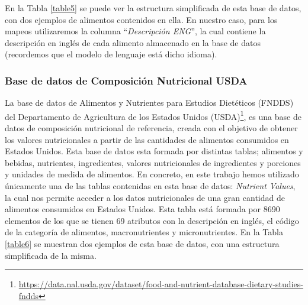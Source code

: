 En la Tabla \ref{table5} se puede ver la estructura simplificada de esta base de datos, con dos ejemplos de alimentos contenidos en ella. En nuestro caso, para los mapeos utilizaremos la columna ``\textit{Descripción ENG}'', la cual contiene la descripción en inglés de cada alimento almacenado en la base de datos (recordemos que el modelo de lenguaje está dicho idioma).


\subsubsection{Base de datos de Composición Nutricional USDA}

La base de datos de Alimentos y Nutrientes para Estudios Dietéticos (FNDDS) del Departamento de Agricultura de los Estados Unidos (USDA)\footnote{\url{https://data.nal.usda.gov/dataset/food-and-nutrient-database-dietary-studies-fndds}}, es una base de datos de composición nutricional de referencia, creada con el objetivo de obtener los valores nutricionales a partir de las cantidades de alimentos consumidos en Estados Unidos. Esta base  de datos esta formada por distintas tablas; alimentos y bebidas, nutrientes, ingredientes, valores nutricionales de ingredientes y porciones y unidades de medida de alimentos. En concreto, en este trabajo hemos utilizado únicamente una de las tablas contenidas en esta base de datos: \textit{Nutrient Values}, la cual nos permite acceder a los datos nutricionales de una gran cantidad de alimentos consumidos en Estados Unidos. Esta tabla está formada por 8690 elementos de los que se tienen 69 atributos con la descripción en inglés, el código de la categoría de alimentos, macronutrientes y micronutrientes. En la Tabla \ref{table6} se muestran dos ejemplos de esta base de datos, con una estructura simplificada de la misma. 


